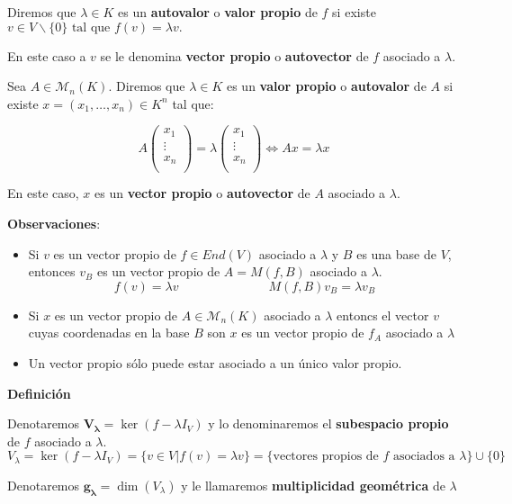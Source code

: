 \documentclass[x11names,table]{report}
\begin{document}
Diremos que $\lambda\in K$ es un \textbf{autovalor} o \textbf{valor propio} de $f$ si existe $v\in V\backslash\{0\} \text{ tal que } f(v)=\lambda v.$

En este caso a $v$ se le denomina \textbf{vector propio} o \textbf{autovector} de $f$ asociado a $\lambda$.

Sea $A\in \mathcal{M}_n(K)$. Diremos que $\lambda\in K$ es un \textbf{valor propio} o \textbf{autovalor} de $A$ si existe $x=(x_1, \dots , x_n)\in K^n$ tal que:

\[A\begin{pmatrix}
x_1\\ \vdots \\ x_n \\
\end{pmatrix} = \lambda \begin{pmatrix}
x_1\\ \vdots \\ x_n \\
\end{pmatrix}\Leftrightarrow Ax=\lambda x
\]

En este caso, $x$ es un \textbf{vector propio} o \textbf{autovector} de $A$ asociado a $\lambda$.

\textbf{Observaciones}:\begin{itemize}
\item Si $v$ es un vector propio de $f\in End(V)$ asociado a $\lambda$ y $B$ es una base de $V$, entonces $v_B$ es un vector propio de $A=M(f,B)$ asociado a $\lambda$.
\[f(v)=\lambda v \hspace{3cm} M(f,B)v_B=\lambda v_B\]
\item Si $x$ es un vector propio de $A\in \mathcal{M}_n(K)$ asociado a $\lambda$ entoncs el vector $v$ cuyas coordenadas en la base $B$ son $x$ es un vector propio de $f_A$ asociado a $\lambda$
\item Un vector propio sólo puede estar asociado a un único valor propio.

\end{itemize}
\textbf{Definición}

Denotaremos $\mathbf{V_\lambda}=\ker(f-\lambda I_V)$ y lo denominaremos el \textbf{subespacio propio} de $f$ asociado a $\lambda$.
\[V_\lambda=\ker(f-\lambda I_V)=\{v\in V | f(v)=\lambda v\}=\{\text{vectores propios de }f\text{ asociados a }\lambda\}\cup\{0\}
\]

Denotaremos $\mathbf{g_\lambda}=\dim(V_\lambda)$ y le llamaremos \textbf{multiplicidad geométrica} de $\lambda$
\end{document}
